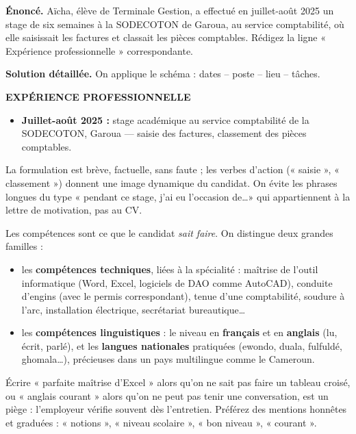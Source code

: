 \documentclass[11pt]{article}
\newcommand{\cle}[1]{{\popxbold\color{popdark}#1}}
\newcounter{popsec}
\newcounter{popsub}
\newcommand{\courssub}[1]{%
  \stepcounter{popsub}%
  \par\vspace{9pt}\noindent{\popxbold\fontsize{11.5}{13}\selectfont\color{popink}{\color{poporange}\thepopsec.\thepopsub}\hspace{6pt}#1}\par\nopagebreak\vspace{4pt}
}
\begin{document}
\begin{exoresolu}
\textbf{Énoncé.} Aïcha, élève de Terminale Gestion, a effectué en juillet-août 2025 un stage de six semaines à la SODECOTON de Garoua, au service comptabilité, où elle saisissait les factures et classait les pièces comptables. Rédigez la ligne « Expérience professionnelle » correspondante.

\tcblower
\textbf{Solution détaillée.} On applique le schéma : dates -- poste -- lieu -- tâches.

\textbf{EXPÉRIENCE PROFESSIONNELLE}
\begin{itemize}
\item \textbf{Juillet-août 2025 :} stage académique au service comptabilité de la SODECOTON, Garoua — saisie des factures, classement des pièces comptables.
\end{itemize}

La formulation est brève, factuelle, sans faute ; les verbes d'action (« saisie », « classement ») donnent une image dynamique du candidat. On évite les phrases longues du type « pendant ce stage, j'ai eu l'occasion de\ldots » qui appartiennent à la lettre de motivation, pas au CV.
\end{exoresolu}

\courssub{La rubrique « Compétences »}

Les \cle{compétences} sont ce que le candidat \emph{sait faire}. On distingue deux grandes familles :

\begin{itemize}
\item les \textbf{compétences techniques}, liées à la spécialité : maîtrise de l'outil informatique (Word, Excel, logiciels de DAO comme AutoCAD), conduite d'engins (avec le permis correspondant), tenue d'une comptabilité, soudure à l'arc, installation électrique, secrétariat bureautique\ldots
\item les \textbf{compétences linguistiques} : le niveau en \textbf{français} et en \textbf{anglais} (lu, écrit, parlé), et les \textbf{langues nationales} pratiquées (ewondo, duala, fulfuldé, ghomala\ldots), précieuses dans un pays multilingue comme le Cameroun.
\end{itemize}

\begin{attention}
Écrire « parfaite maîtrise d'Excel » alors qu'on ne sait pas faire un tableau croisé, ou « anglais courant » alors qu'on ne peut pas tenir une conversation, est un piège : l'employeur vérifie souvent dès l'entretien. Préférez des mentions honnêtes et graduées : « notions », « niveau scolaire », « bon niveau », « courant ».
\end{attention}
\end{document}
